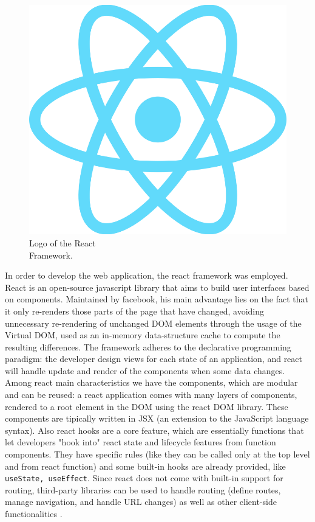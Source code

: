 \begin{figure} %
    \captionsetup{font=footnotesize}
    \centering
    \includegraphics[width=\linewidth]{images/react.png}
    \caption{Logo of the React\\Framework.}
\end{figure}

In order to develop the web application, the react framework was employed. React is an open-source javascript library that aims to build user interfaces based on components. Maintained by facebook, his main advantage lies on the fact that it only re-renders those parts of the page that have changed, avoiding unnecessary re-rendering of unchanged DOM elements through the usage of the Virtual DOM, used as an in-memory data-structure cache to compute the resulting differences. The framework adheres to the declarative programming paradigm: the developer design views for each state of an application, and react will handle update and render of the components when some data changes. Among react main characteristics we have the components, which are modular and can be reused: a react application comes with many layers of components, rendered to a root element in the DOM using the react DOM library. These components are tipically written in JSX (an extension to the JavaScript language syntax). Also react hooks are a core feature, which are essentially functions that let developers "hook into" react state and lifecycle features from function components. They have specific rules (like they can be called only at the top level and from react function) and some built-in hooks are already provided, like \texttt{useState, useEffect}. Since react does not come with built-in support for routing, third-party libraries can be used to handle routing (define routes, manage navigation, and handle URL changes) as well as other client-side functionalities \cite{React}. 
\newpage
